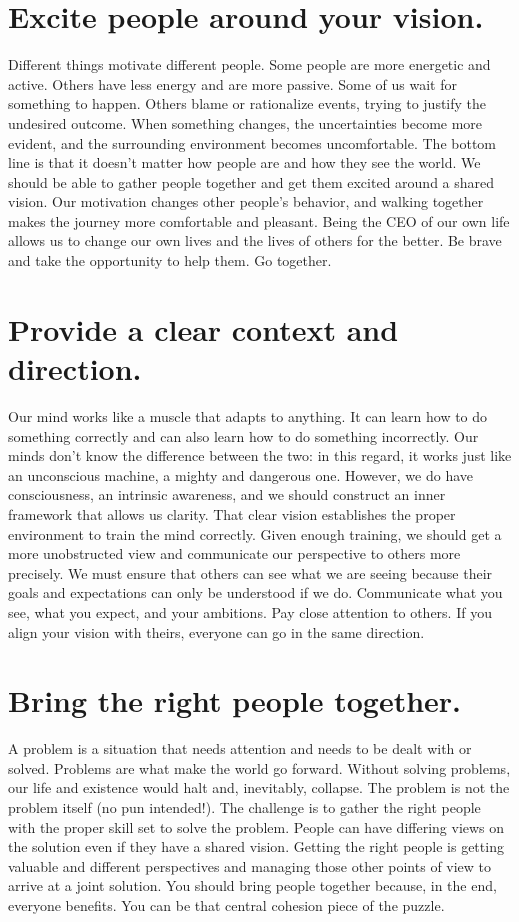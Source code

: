 \documentclass[10pt,a4paper]{book}
\begin{document}
\section{Excite people around your vision.}

Different things motivate different people. Some people are more energetic and active. Others have less energy and are more passive. Some of us wait for something to happen. Others blame or rationalize events, trying to justify the undesired outcome. When something changes, the uncertainties become more evident, and the surrounding environment becomes uncomfortable. The bottom line is that it doesn't matter how people are and how they see the world. We should be able to gather people together and get them excited around a shared vision. Our motivation changes other people's behavior, and walking together makes the journey more comfortable and pleasant. Being the CEO of our own life allows us to change our own lives and the lives of others for the better. Be brave and take the opportunity to help them. Go together.

\section{Provide a clear context and direction.}

Our mind works like a muscle that adapts to anything. It can learn how to do something correctly and can also learn how to do something incorrectly. Our minds don't know the difference between the two: in this regard, it works just like an unconscious machine, a mighty and dangerous one. However, we do have consciousness, an intrinsic awareness, and we should construct an inner framework that allows us clarity. That clear vision establishes the proper environment to train the mind correctly. Given enough training, we should get a more unobstructed view and communicate our perspective to others more precisely. We must ensure that others can see what we are seeing because their goals and expectations can only be understood if we do. Communicate what you see, what you expect, and your ambitions. Pay close attention to others. If you align your vision with theirs, everyone can go in the same direction.

\section{Bring the right people together.}

A problem is a situation that needs attention and needs to be dealt with or solved. Problems are what make the world go forward. Without solving problems, our life and existence would halt and, inevitably, collapse. The problem is not the problem itself (no pun intended!). The challenge is to gather the right people with the proper skill set to solve the problem. People can have differing views on the solution even if they have a shared vision. Getting the right people is getting valuable and different perspectives and managing those other points of view to arrive at a joint solution. You should bring people together because, in the end, everyone benefits. You can be that central cohesion piece of the puzzle.
\end{document}
